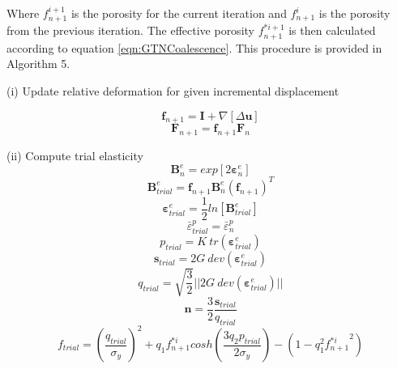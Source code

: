 \documentclass[sn-mathphys,Numbered,draft]{sn-jnl}%
\begin{document}
Where ${f}_{n+1}^{i+1}$ is the porosity for the current iteration and $f_{n+1}^i$ is the porosity from the previous iteration. The effective porosity $f^{*i+1}_{n+1}$ is then calculated according to equation \ref{eqn:GTNCoalescence}.
This procedure is provided in Algorithm 5.

\begin{algorithm}[H]
\SetAlgoLined
(i) Update relative deformation for given incremental displacement

\begin{equation}
  \textbf{f}_{n+1}=\textbf{I}+\nabla\left[\Delta\textbf{u}\right]\nonumber
\end{equation}
\begin{equation}
 \textbf{F}_{n+1}=\textbf{f}_{n+1}\textbf{F}_n\nonumber
\end{equation}

(ii) Compute trial elasticity
\begin{equation}
\mathbf{B}^{e}_{n}=exp\left[{2\boldsymbol{\varepsilon}^{e}_{n}}\right]\nonumber
\end{equation}
\begin{equation}
\mathbf{B}^{e}_{trial}=\mathbf{f}_{n+1}\mathbf{B}^{e}_{n}(\mathbf{f}_{n+1})^{T}\nonumber
\end{equation}
\begin{equation}
\boldsymbol{\varepsilon}^{e}_{trial}=\frac{1}{2}ln[\textbf{B}^{e}_{trial}]\nonumber
\end{equation}
\begin{equation}
\bar{\varepsilon}^{p}_{trial}=\bar{\varepsilon}^{p}_{n}\nonumber
\end{equation}
\begin{equation}
p_{trial}=K\ tr(\boldsymbol{\varepsilon}^{e}_{trial})\nonumber
\end{equation}
\begin{equation}
\mathbf{s}_{trial}=2G\ dev(\boldsymbol{\varepsilon}^{e}_{trial})\nonumber
\end{equation}
\begin{equation}
q_{trial}=\sqrt{\frac{3}{2}}\lvert\lvert2G\ dev(\boldsymbol{\varepsilon}^{e}_{trial})\rvert\rvert\nonumber
\end{equation}
\begin{equation}
    \mathbf{n}=\frac{3}{2}\frac{\mathbf{s}_{trial}}{q_{trial}}\nonumber
\end{equation}
\begin{equation}
f_{trial}=  \left(\frac{{q}_{trial}}{\sigma_{y}}\right)^{2}+q_{1}f^{*i}_{n+1}cosh\left(\frac{3q_{2}p_{trial}}{2\sigma_{y}}\right)-\left(1-q_{1}^{2}{f^{*i}_{n+1}}^2\right)\nonumber
\end{equation}


\end{algorithm}
\end{document}

